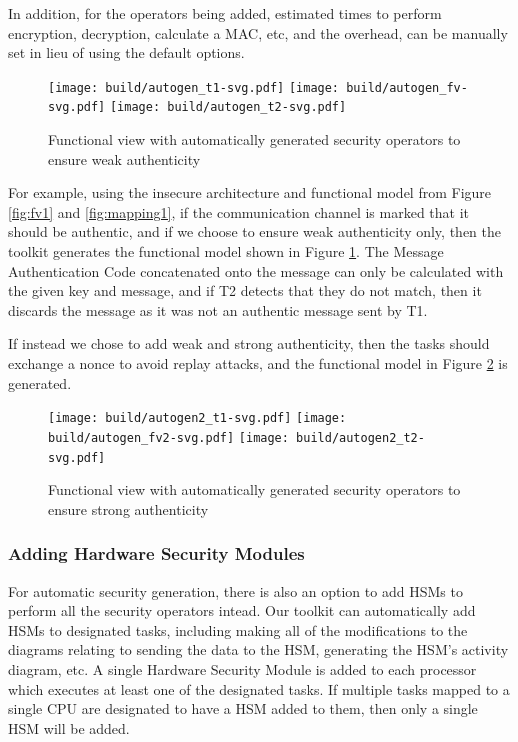 \documentclass[12pt]{article}
\begin{document}
  In addition, for the operators being added, estimated times to perform encryption, decryption, calculate a MAC, etc, and the overhead, can be manually set in lieu of using the default options. 

\begin{figure}[htbp]
\centering
\texttt{[image: build/autogen\_t1-svg.pdf]}
\texttt{[image: build/autogen\_fv-svg.pdf]}
\texttt{[image: build/autogen\_t2-svg.pdf]}
\caption{Functional view with automatically generated security operators to ensure weak authenticity} \label{fig:secfv1}
\end{figure}
  
  For example, using the insecure architecture and functional model from Figure \ref{fig:fv1} and \ref{fig:mapping1}, if the communication channel is marked that it should be authentic, and if we choose to ensure weak authenticity only, then the toolkit generates the functional model shown in Figure \ref{fig:secfv1}. The Message Authentication Code concatenated onto the message can only be calculated with the given key and message, and if T2 detects that they do not match, then it discards the message as it was not an authentic message sent by T1.
  
  If instead we chose to add weak and strong authenticity, then the tasks should exchange a nonce to avoid replay attacks, and the functional model in Figure \ref{fig:secfv2} is generated. 

\begin{figure}[htbp]
\centering
\texttt{[image: build/autogen2\_t1-svg.pdf]}
\texttt{[image: build/autogen\_fv2-svg.pdf]}
\texttt{[image: build/autogen2\_t2-svg.pdf]}
\caption{Functional view with automatically generated security operators to ensure strong authenticity} \label{fig:secfv2}
\end{figure}

\subsubsection{Adding Hardware Security Modules} 

For automatic security generation, there is also an option to add HSMs to perform all the security operators intead. 
Our toolkit can automatically add
HSMs to designated tasks, including making all of the modifications to the
diagrams relating to sending the data to the HSM, generating the HSM's activity
diagram, etc. A single Hardware Security Module is added to each processor which executes at least one of the designated tasks. If multiple tasks mapped to a single CPU are designated to have a HSM added to them, then only a single HSM will be added.
\end{document}
